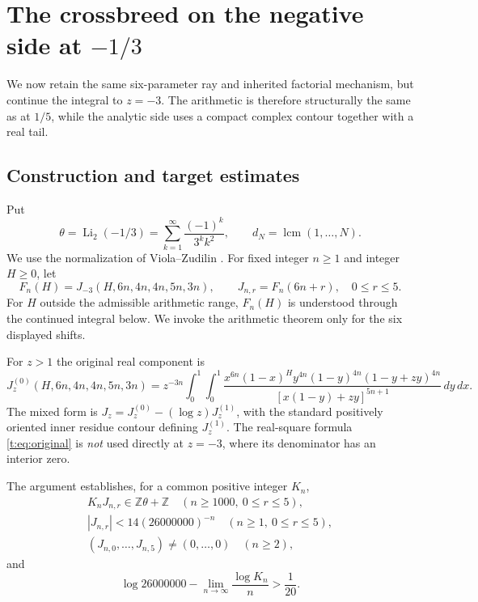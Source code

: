 \documentclass[11pt]{amsart}
\newcommand{\Li}{\operatorname{Li}}
\newcommand{\Z}{\mathbb Z}
\newcommand{\dd}{\,d}
\newcommand{\lcm}{\operatorname{lcm}}
\theoremstyle{plain}
\theoremstyle{remark}\newtheorem{remark}[theorem]{Remark}
\numberwithin{equation}{section}
\begin{document}
\section{The crossbreed on the negative side at $-1/3$}\label{sec:third}
We now retain the same six-parameter ray and inherited factorial mechanism, but continue the integral to $z=-3$.  The arithmetic is therefore structurally the same as at $1/5$, while the analytic side uses a compact complex contour together with a real tail.
\subsection{Construction and target estimates}
Put
\[
 \theta=\Li_2(-1/3)=\sum_{k=1}^{\infty}\frac{(-1)^k}{3^k k^2},
 \qquad d_N=\lcm(1,\ldots,N).
\]
We use the normalization of Viola--Zudilin \cite{VZ18}. For fixed integer
$n\ge1$ and integer $H\ge0$, let
\[
 F_n(H)=J_{-3}(H,6n,4n,4n,5n,3n),\qquad
 J_{n,r}=F_n(6n+r),\quad 0\le r\le5.
\]
For $H$ outside the admissible arithmetic range, $F_n(H)$ is understood
through the continued integral below. We invoke the arithmetic theorem only
for the six displayed shifts.

For $z>1$ the original real component is
\begin{equation}\label{t:eq:original}
 J_z^{(0)}(H,6n,4n,4n,5n,3n)
 =z^{-3n}\int_0^1\!\int_0^1
 \frac{x^{6n}(1-x)^H y^{4n}(1-y)^{4n}(1-y+zy)^{4n}}
 {[x(1-y)+zy]^{5n+1}}\dd y\dd x.
\end{equation}
The mixed form is $J_z=J_z^{(0)}-(\log z)J_z^{(1)}$, with the standard
positively oriented inner residue contour defining $J_z^{(1)}$.
The real-square formula \eqref{t:eq:original} is \emph{not} used directly at
$z=-3$, where its denominator has an interior zero.

The argument establishes, for a common positive integer $K_n$,
\begin{equation}\label{t:eq:three}
 \begin{gathered}
 K_nJ_{n,r}\in\Z\theta+\Z\quad(n\ge1000,\ 0\le r\le5),\\
 |J_{n,r}|<14(26000000)^{-n}\quad(n\ge1,\ 0\le r\le5),\\
 (J_{n,0},\ldots,J_{n,5})\ne(0,\ldots,0)\quad(n\ge2),
 \end{gathered}
\end{equation}
and
\[
 \log26000000-\lim_{n\to\infty}\frac{\log K_n}{n}>
 \frac1{20}.
\]
\end{document}
